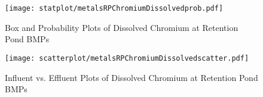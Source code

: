         \begin{figure}[hb]   %
            \centering
            \texttt{[image: statplot/metalsRPChromiumDissolvedprob.pdf]}
            \caption{Box and Probability Plots of Dissolved Chromium at Retention Pond BMPs}
        \end{figure}         %
        
        
        \begin{figure}[hb]   %
            \centering
            \texttt{[image: scatterplot/metalsRPChromiumDissolvedscatter.pdf]}
            \caption{Influent vs. Effluent Plots of Dissolved Chromium at Retention Pond BMPs}
        \end{figure}         %
        \clearpage
        